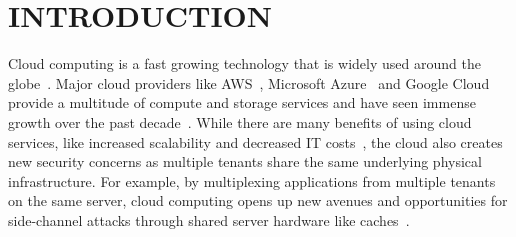 \section{INTRODUCTION}
\label{sec:intro}



Cloud computing is a fast growing technology that is widely used around the
globe~.
Major cloud providers like AWS~\cite{awscloud}, Microsoft
Azure~\cite{azurecloud} and Google Cloud~\cite{googlecloud} provide a multitude
of compute and storage services and have seen immense growth over the past
decade~. While there are many benefits of using cloud services, like
increased scalability and decreased IT costs~\cite{Armbrust}, the cloud also
creates new security concerns as multiple tenants share the same underlying
physical infrastructure. For example, by multiplexing applications from multiple
tenants on the same server, cloud computing opens up new avenues and
opportunities for side-channel attacks through shared server hardware like
caches~\cite{meltdown, xuccsw2011}.  




